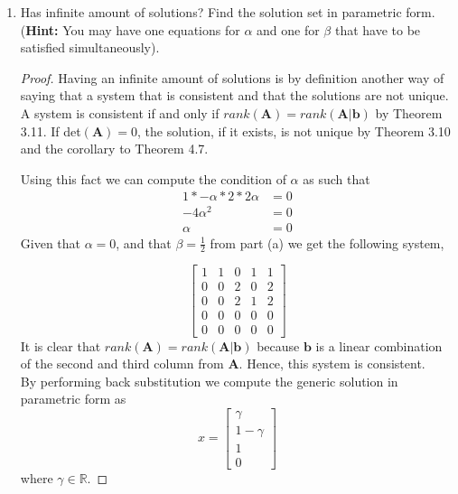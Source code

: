 \documentclass[11pt]{scrartcl}
\begin{document}
\begin{enumerate}[label=\alph*.]
	\item{
	      Has infinite amount of solutions? Find the solution set in parametric form.
	      (\textbf{Hint:} You may have one equations for $\alpha$ and one for $\beta$ that have to be satisfied simultaneously).
	      \begin{proof}
		      Having an infinite amount of solutions is by definition another way of saying
		      that a system that is consistent and that the solutions are not unique.
		      A system is consistent if and only if $rank(\mathbf{A}) = rank(\mathbf{A}|\mathbf{b})$
		      by Theorem 3.11. If det$(\mathbf{A}) = 0$, the solution, if it exists, is not unique by
		      Theorem 3.10 and the corollary to Theorem 4.7.

		      Using this fact we can compute the condition of $\alpha$ as such that
		      \begin{align*}
			      1*-\alpha*2*2\alpha & = 0 \\
			      -4\alpha^2          & = 0 \\
			      \alpha              & = 0
		      \end{align*}
		      Given that $\alpha = 0$, and that $\beta = \frac12$ from part (a)
		      we get the following system,

		      \[
			      \left [ \begin{array}{cccc|c}
					      1 & 1 & 0 & 1 & 1 \\
					      0 & 0 & 2 & 0 & 2 \\
					      0 & 0 & 2 & 1 & 2 \\
					      0 & 0 & 0 & 0 & 0 \\
					      0 & 0 & 0 & 0 & 0
				      \end{array} \right ]
		      \]
		      It is clear that  $rank(\mathbf{A}) = rank(\mathbf{A}|\mathbf{b})$ because
		      $\mathbf{b}$ is a linear combination of the second and third column from
		      $\mathbf{A}$. Hence, this system is consistent. \\
		      By performing back substitution we compute the generic solution
		      in parametric form as
		      \[
			      x = \begin{bmatrix}
				      \gamma     \\
				      1 - \gamma \\
				      1          \\
				      0
			      \end{bmatrix}
		      \]
		      where $\gamma \in \mathbb{R}$.
	      \end{proof}
	      }
\end{enumerate}
\end{document}
